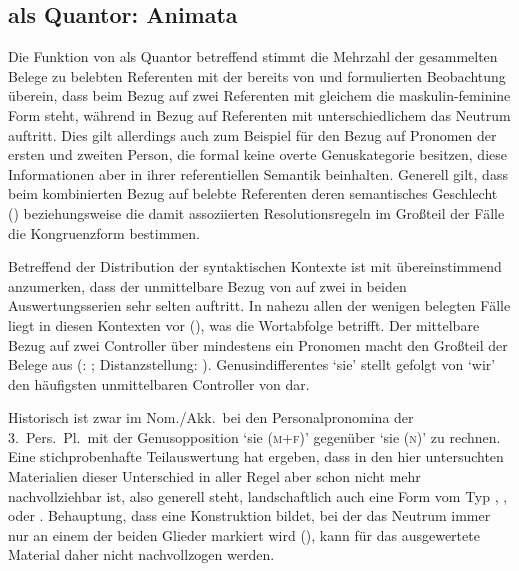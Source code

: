 \subsection{ als Quantor: Animata}

Die Funktion von  als Quantor betreffend stimmt die Mehrzahl der
gesammelten Belege zu belebten Referenten mit der bereits von
\citet[312]{grimm1890} und \citet[39--41]{behaghel1928} formulierten
Beobachtung überein, dass beim Bezug auf zwei Referenten mit gleichem
 die maskulin-feminine Form steht, während in Bezug auf Referenten
mit unterschiedlichem  das Neutrum auftritt. Dies gilt allerdings
auch zum Beispiel für den Bezug auf Pronomen der ersten und zweiten Person, die
formal keine overte Genuskategorie besitzen, diese
Informationen aber in ihrer referentiellen Semantik beinhalten. Generell gilt,
dass beim kombinierten Bezug auf belebte Referenten deren semantisches
Geschlecht () beziehungsweise die damit assoziierten
Resolutionsregeln im Großteil der Fälle die Kongruenzform bestimmen.

Betreffend der Distribution der syntaktischen
Kontexte ist mit \citet[624, Abbildung
P~179]{ksw2} übereinstimmend anzumerken, dass der unmittelbare
Bezug von  auf zwei  in beiden Auswertungsserien
sehr selten auftritt. In nahezu allen der wenigen belegten Fälle liegt in
diesen Kontexten  vor (), was die Wortabfolge betrifft. Der
mittelbare Bezug auf zwei Controller über mindestens ein Pronomen macht den
Großteil der Belege aus (: ; Distanzstellung: ).
Genus\-indifferentes  `sie' stellt gefolgt von
 `wir' den häufigsten unmittelbaren Controller von  dar.

Historisch ist zwar im Nom./Akk.\ bei den
Personalpronomina der 3.~Pers.\ Pl.\ mit der
Genus\-opposition  `sie (\textsc{m+f})' gegenüber  `sie
(\textsc{n})' zu rechnen. Eine stichprobenhafte Teilauswertung
hat ergeben, dass in den hier untersuchten Materialien dieser Unterschied in
aller Regel aber schon nicht mehr nachvollziehbar ist, also generell 
steht, landschaftlich auch eine Form vom Typ
,
,
 oder
\autocites[vgl.][213--214]{paul2007}[369, 390--397]{ksw2}[482--483]{wmu1}.
 Behauptung, dass  eine
Konstruktion bildet, bei der das Neutrum immer nur an einem der beiden Glieder
markiert wird (), kann für das ausgewertete Material daher
nicht nachvollzogen werden.

